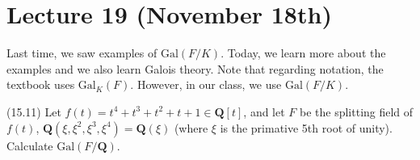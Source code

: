 \section{Lecture 19 (November 18th)}
\begin{rmk}
Last time, we saw examples of $\mathrm{Gal}(F/K)$. Today, we learn more about the examples and we also learn Galois theory. Note that regarding notation, the textbook uses $\mathrm{Gal}_{K}(F)$. However, in our class, we use $\mathrm{Gal}(F/K)$. 
\end{rmk}
\vspace{2ex}
\begin{ex}
(15.11) Let $f(t)=t^{4}+t^{3}+t^2+t+1\in {\bm Q}[t]$, and let $F$ be the splitting field of $f(t)$, ${\bm Q}(\xi ,\xi ^2,\xi ^3,\xi ^{4})={\bm Q}(\xi )$ (where $\xi $ is the primative 5th root of unity). Calculate $\mathrm{Gal}(F/{\bm Q})$. 
\end{ex}
\vspace{2ex}
